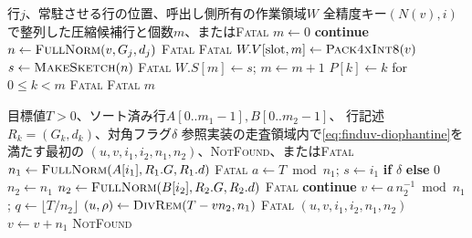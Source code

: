 \documentclass[a4paper,10pt]{ltjsarticle}
\theoremstyle{definition}
\theoremstyle{remark}
\begin{document}
\begin{algorithm}[H]
  \caption{一行の候補生成と全精度順への整列}
  \label{alg:prepare-row}
  \small
  \begin{algorithmic}[1]
    \Require 行$j$、常駐させる行の位置、呼出し側所有の作業領域$W$
    \Ensure 全精度キー$(N(v),i)$で整列した圧縮候補行と個数$m$、または\textsc{Fatal}
      \State $m\gets0$
         \State \textbf{continue} \EndIf
        \State $n\gets\Call{FullNorm}{v,G_j,d_j}$
         \State \Return \textsc{Fatal} \EndIf
           \State \Return \textsc{Fatal} \EndIf
          \State $W.V[\mathrm{slot},m]\gets\Call{Pack4xInt8}{v}$
          \State $s\gets\Call{MakeSketch}{n}$
           \State \Return \textsc{Fatal} \EndIf
          \State $W.S[m]\gets s$; $m\gets m+1$
        \EndIf
      \EndFor
      \State $P[k]\gets k$ for $0\leq k<m$
      \State {}
       \State \Return \textsc{Fatal} \EndIf
        \State \Return \textsc{Fatal}
      \EndIf
      \State \Return $m$
    \EndFunction
  \end{algorithmic}
\end{algorithm}

\begin{algorithm}[H]
  \caption{参照走査順を保つソート済み二行の候補対探索}
  \label{alg:pair-search}
  \small
  \begin{algorithmic}[1]
    \Require 目標値$T>0$、ソート済み行$A[0..m_1-1],B[0..m_2-1]$、
      行記述$R_k=(G_k,d_k)$、対角フラグ$\delta$
    \Ensure 参照実装の走査領域内で\cref{eq:finduv-diophantine}を満たす最初の
      $(u,v,i_1,i_2,n_1,n_2)$、\textsc{NotFound}、または\textsc{Fatal}
        \State $n_1\gets\Call{FullNorm}{A[i_1],R_1.G,R_1.d}$
         \State \Return \textsc{Fatal} \EndIf
        \State $a\gets T\bmod n_1$; $s\gets i_1$ \textbf{if} $\delta$ \textbf{else} $0$
            \State $n_2\gets n_1$
          \Else
            \State $n_2\gets\Call{FullNorm}{B[i_2],R_2.G,R_2.d}$
             \State \Return \textsc{Fatal} \EndIf
          \EndIf
           \State \textbf{continue} \EndIf
          \State $v\gets a\,n_2^{-1}\bmod n_1$; $q\gets\lfloor T/n_2\rfloor$
            \State $(u,\rho)\gets\Call{DivRem}{T-vn_2,n_1}$
             \State \Return \textsc{Fatal} \EndIf
             \State \Return $(u,v,i_1,i_2,n_1,n_2)$ \EndIf
            \State $v\gets v+n_1$
          \EndWhile
        \EndFor
      \EndFor
      \State \Return \textsc{NotFound}
    \EndFunction
  \end{algorithmic}
\end{algorithm}
\end{document}
